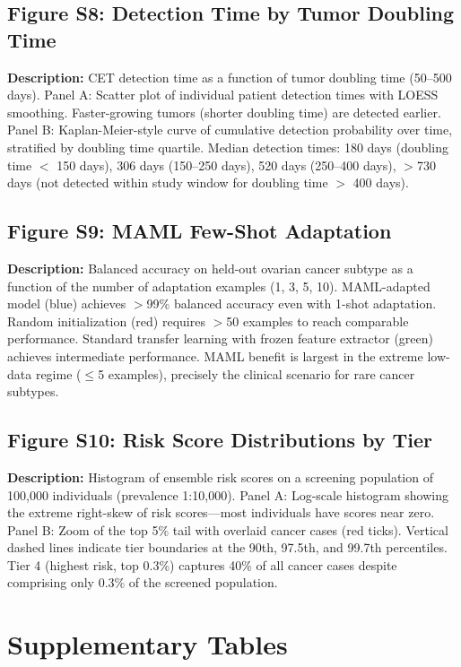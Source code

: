\documentclass[10pt,a4paper]{article}
\begin{document}
\subsection*{Figure S8: Detection Time by Tumor Doubling Time}
\textbf{Description:} CET detection time as a function of tumor doubling time (50--500 days). Panel A: Scatter plot of individual patient detection times with LOESS smoothing. Faster-growing tumors (shorter doubling time) are detected earlier. Panel B: Kaplan-Meier-style curve of cumulative detection probability over time, stratified by doubling time quartile. Median detection times: 180 days (doubling time $<$ 150 days), 306 days (150--250 days), 520 days (250--400 days), $>$730 days (not detected within study window for doubling time $>$ 400 days).

\subsection*{Figure S9: MAML Few-Shot Adaptation}
\textbf{Description:} Balanced accuracy on held-out ovarian cancer subtype as a function of the number of adaptation examples (1, 3, 5, 10). MAML-adapted model (blue) achieves $>$99\% balanced accuracy even with 1-shot adaptation. Random initialization (red) requires $>$50 examples to reach comparable performance. Standard transfer learning with frozen feature extractor (green) achieves intermediate performance. MAML benefit is largest in the extreme low-data regime ($\leq$5 examples), precisely the clinical scenario for rare cancer subtypes.

\subsection*{Figure S10: Risk Score Distributions by Tier}
\textbf{Description:} Histogram of ensemble risk scores on a screening population of 100,000 individuals (prevalence 1:10,000). Panel A: Log-scale histogram showing the extreme right-skew of risk scores—most individuals have scores near zero. Panel B: Zoom of the top 5\% tail with overlaid cancer cases (red ticks). Vertical dashed lines indicate tier boundaries at the 90th, 97.5th, and 99.7th percentiles. Tier 4 (highest risk, top 0.3\%) captures 40\% of all cancer cases despite comprising only 0.3\% of the screened population.

\newpage

\section{Supplementary Tables}
\end{document}
